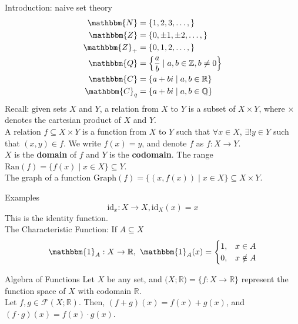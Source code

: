 \documentclass[10pt]{extarticle}
\title{}
\author{Avinash Iyer}
\date{}
\begin{document}
  \begin{problem}{Introduction: naive set theory}
    \begin{align*}
      \mathbbm{N} &= \{1,2,3,\dots,\}\\
      \mathbbm{Z} &= \{0,\pm1,\pm2,\dots,\} \\
      \mathbbm{Z}_+ &= \{0,1,2,\dots,\}\\
      \mathbbm{Q} &= \left\{\frac{a}{b} \mid a,b\in\mathbb{Z},b\neq 0\right\}\\
      \mathbbm{C} &= \{a+bi \mid a,b\in \mathbb{R}\}\\
      \mathbbm{C}_q &= \{a+bi \mid a,b\in \mathbb{Q}\}
    \end{align*}
    Recall: given sets $X$ and $Y$, a relation from $X$ to $Y$ is a subset of $X\times Y$, where $\times$ denotes the cartesian product of $X$ and $Y$.\\

    A relation $f\subseteq X\times Y$ is a function from $X$ to $Y$ such that $\forall x\in X$, $\exists!y\in Y$ such that $(x,y) \in f$. We write $f(x) = y$, and denote $f$ as $f:X\rightarrow Y$.\\

    $X$ is the \textbf{domain} of $f$ and $Y$ is the \textbf{codomain}. The range $\text{Ran}(f) = \{f(x)\mid x\in X\}\subseteq Y$. \\

    The graph of a function $\text{Graph}(f) = \{(x,f(x))\mid x\in X\} \subseteq X\times Y$.
    \begin{problem}{Examples}
      \[\text{id}_x: X\rightarrow X, \text{id}_X(x) = x\]
      This is the identity function.\\

      The Characteristic Function: If $A\subseteq X$
      \[\mathbbm{1}_A: X\rightarrow \mathbb{R}, ~\mathbbm{1}_A(x) = \begin{cases}
        1,&x\in A\\
        0,&x\notin A
      \end{cases}\]
    \end{problem}
    \begin{problem}{Algebra of Functions}
      Let $X$ be any set, and $\mathcal(X;\mathbb{R}) = \{f:X\rightarrow \mathbb{R}\}$ represent the function space of $X$ with codomain $\mathbb{R}$.\\

      Let $f,g\in \mathcal{F}(X;\mathbb{R})$. Then, $(f+g)(x) = f(x) + g(x)$, and $(f\cdot g)(x) = f(x)\cdot g(x)$.\\


\end{problem}
\end{problem}
\end{document}
